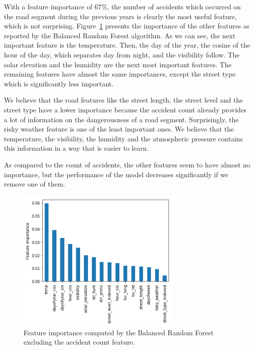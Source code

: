 \documentclass[conference]{IEEEtran}
\begin{document}
With a
feature importance of $67\%$, the number of accidents which occurred on the
road segment during the previous years is clearly the most useful feature, which
is not surprising. Figure~\ref{feature importances} presents the
importance of the other features as reported by the Balanced Random Forest
algorithm. As we can see, the next important feature is the temperature. 
Then, the day of the year, the cosine of the hour of the day, which separates day from night,
and the visibility follow. The solar elevation and the humidity are the next most important features. The remaining features have almost the same importances, except the street type which
is significantly less important.

We believe that the road features like the street length, the street level and the street type have a lower importance because the accident count already provides a lot of information on the dangerousness of a road segment. Surprisingly, the risky weather feature is one of the least important ones. We believe that the temperature, the visibility, the humidity and the atmospheric pressure contains this information in a way that is easier to learn. 

As compared to the count of accidents, the other features seem to have almost no
importance, but the performance of the model decreases significantly if we
remove one of them. 

\begin{figure}[htbp]
\centerline{\includegraphics[height=7cm, keepaspectratio]{Figures/brf_fi_nocount.png}}
\caption{Feature importance computed by the Balanced Random Forest excluding the accident count feature.}
\label{feature importances}
\end{figure}

\end{document}
